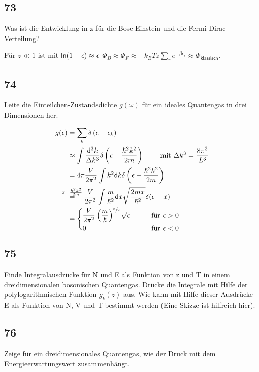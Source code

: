 \subsection{73}
\begin{myfrag}
Was ist die Entwicklung in z für die Bose-Einstein und die Fermi-Dirac
Verteilung?
\end{myfrag}
Für $z\ll 1$ ist mit $\mathsf{ln}(1+\epsilon)\approx\epsilon$ $\Phi_B\approx\Phi_F\approx-k_BTz\sum\limits_re^{-\beta\epsilon_r}\approx\Phi_\mathsf{klassisch}$.
\subsection{74}
\begin{myfrag}
Leite die Einteilchen-Zustandsdichte $g(\omega )$ für ein ideales Quantengas in drei
Dimensionen her.
\end{myfrag}
\begin{align}
	g(\epsilon)&=\sum\limits_k\delta\left(\epsilon-\epsilon_k\right)\nonumber\\
	&\approx\int \frac{\dif^3k}{\Delta k^3}\delta\left(\epsilon-\frac{\hbar^2k^2}{2m}\right)\qquad\text{ mit }\Delta k^3=\frac{8\pi^3}{L^3}\\
	&=4\pi\frac{V}{2\pi^2}\int k^2\dif k\delta\left(\epsilon-\frac{\hbar^2k^2}{2m}\right)\nonumber\\
	&\overset{x=\frac{\hbar^2k^2}{2m}}{=}\frac{V}{2\pi^2}\int\frac{m}{\hbar^2}\dif x\sqrt{\frac{2mx}{\hbar^2}}\delta(\epsilon-x)\\
	&=\begin{dcases}\frac{V}{2\pi^2}\left(\frac{m}{\hbar}\right)^{\sfrac{3}{2}}\sqrt{\epsilon}\qquad&\text{für }\epsilon>0\\
	0\qquad&\text{für }\epsilon<0\end{dcases}
\end{align}

\subsection{75}
\begin{myfrag}
Finde Integralausdrücke für N und E als Funktion von z und T in einem
dreidimensionalen bosonischen Quantengas. Drücke die Integrale mit Hilfe
der polylogarithmischen Funktion $g_\nu (z)$  aus. Wie kann mit Hilfe dieser
Ausdrücke E als Funktion von N, V und T bestimmt werden (Eine Skizze ist
hilfreich hier).
\end{myfrag}
\subsection{76}
\begin{myfrag}
Zeige für ein dreidimensionales Quantengas, wie der Druck mit dem
Energieerwartungswert zusammenhängt.
\end{myfrag}
